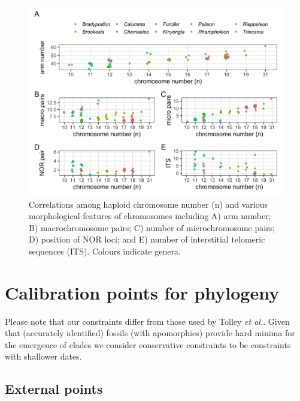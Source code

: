 \documentclass[a4paper, 12pt]{article}
\begin{document}
\begin{figure}[H]
 \centering
  \includegraphics[width = \linewidth]{figures/morphology-chromono.png}
  \caption{Correlations among haploid chromosome number (n) and various morphological features of chromosomes including A) arm number; B) macrochromosome pairs; C) number of microchromosome pairs; D) position of NOR loci; and E) number of interstitial telomeric sequences (ITS). Colours indicate genera.
}
  \label{fig-morph}
\end{figure} 

\newpage
\section{Calibration points for phylogeny}

Please note that our constraints differ from those used by Tolley \textit{et al.}\cite{tolley2013large}. Given that (accurately identified) fossils (with apomorphies) provide hard minima for the emergence of clades we consider conservative constraints to be constraints with shallower dates.
 
\subsection{External points}
 
\end{document}
